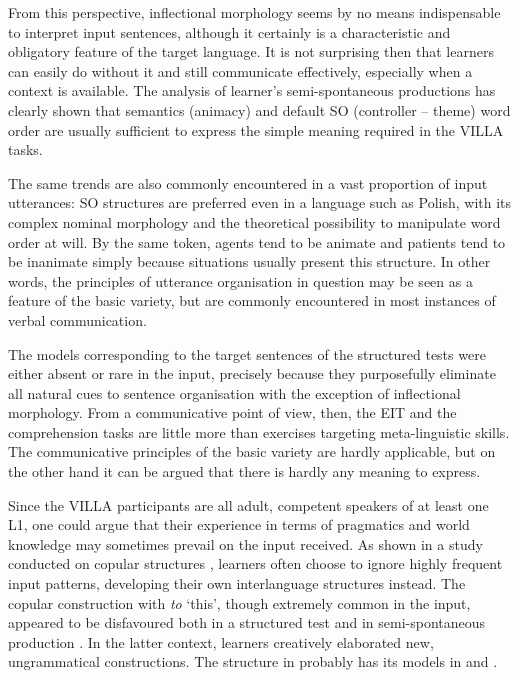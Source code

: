 From this perspective, inflectional morphology seems by no means indispensable to interpret input sentences, although it certainly is a characteristic and obligatory feature of the target language. It is not surprising then that learners can easily do without it and still communicate effectively, especially when a context is available. The analysis of learner’s semi-spontaneous productions has clearly shown that semantics (animacy) and default SO (controller – theme) word order are usually sufficient to express the simple meaning required in the VILLA tasks. 

The same trends are also commonly encountered in a vast proportion of input utterances: SO structures are preferred even in a language such as Polish, with its complex nominal morphology and the theoretical possibility to manipulate word order at will. By the same token, agents tend to be animate and patients tend to be inanimate simply because situations usually present this structure. In other words, the principles of utterance organisation in question may be seen as a feature of the basic variety, but are commonly encountered in most instances of verbal communication.

The models corresponding to the target sentences of the structured tests were either absent or rare in the input, precisely because they purposefully eliminate all natural cues to sentence organisation with the exception of inflectional morphology. From a communicative point of view, then, the EIT and the comprehension tasks are little more than exercises targeting meta-linguistic skills. The communicative principles of the basic variety are hardly applicable, but on the other hand it can be argued that there is hardly any meaning to express. 

Since the VILLA participants are all adult, competent speakers of at least one L1, one could argue that their experience in terms of pragmatics and world knowledge may sometimes prevail on the input received. As shown in a study conducted on copular structures \citep{Saturno2015}, learners often choose to ignore highly frequent input patterns, developing their own interlanguage structures instead. The copular construction with \textit{to} ‘this’, though extremely common in the input, appeared to be disfavoured both in a structured test and in semi-spontaneous production \citep{Saturno2018}. In the latter context, learners creatively elaborated new, ungrammatical constructions. The structure in  probably has its models in  and .

